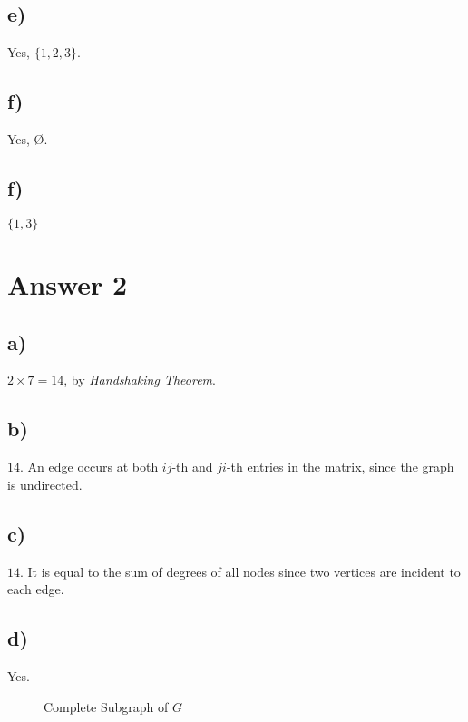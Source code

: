 \documentclass[12pt]{article}
\begin{document}
\subsection*{e)}
Yes, $\{1, 2, 3\}$.

\subsection*{f)}
Yes, \O.

\subsection*{f)}
$\{1, 3\}$

\section*{Answer 2}

\subsection*{a)}
$2 \times 7 = 14$, by \textit{Handshaking Theorem}.

\subsection*{b)}
$14$. An edge occurs at both $ij$-th and $ji$-th entries in the matrix, since the graph is undirected.

\subsection*{c)}
$14$. It is equal to the sum of degrees of all nodes since two vertices are incident to each edge.

\subsection*{d)}
Yes.
\begin{figure}[H]
    \centering
    \caption{Complete Subgraph of $G$}
    \label{fig:complete}
\end{figure}
\end{document}
